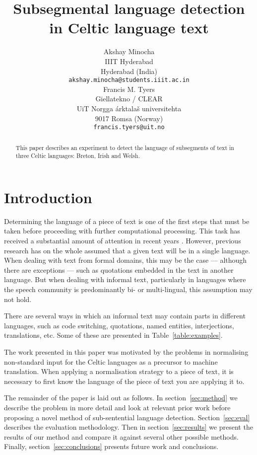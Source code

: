 \documentclass[11pt]{article}
\title{Subsegmental language detection in Celtic language text}
\author{Akshay Minocha \\
  IIIT Hyderabad  \\
  Hyderabad (India) \\
  {\small {\tt akshay.minocha@students.iiit.ac.in}} \\\And
  Francis M. Tyers \\
  Giellatekno / CLEAR \\
  UiT Norgga \'arktala\v{s} universitehta  \\
  9017 Romsa (Norway) \\
  {\small {\tt francis.tyers@uit.no}} \\}
\date{}
\begin{document}
\maketitle
\begin{abstract}
  This paper describes an experiment to detect the language of subsegments
  of text in three Celtic languages: Breton, Irish and Welsh. 
\end{abstract}

\section{Introduction}
\label{intro}

Determining the language of a piece of text is one of the first steps that must be taken
before proceeding with further computational processing. This task has received a substantial amount of
attention in recent years \cite{cavnar1994n,lui2012langid}. However, previous research has on the whole assumed
that a given text will be in a single language. When dealing with text from formal domains,
this may be the case --- although there are exceptions --- such as quotations embedded in
the text in another language. But when dealing with informal text, particularly in languages
where the speech community is predominantly bi- or multi-lingual, this assumption may not hold.

There are several ways in which an informal text may contain parts in different languages, such as
code switching, quotations, named entities, interjections, translations, etc. Some of these are presented
in Table~\ref{table:examples}.

The work presented in this paper was motivated by the problems in normalising non-standard input
for the Celtic languages as a precursor to machine translation. When applying a normalisation 
strategy to a piece of text, it is necessary to first know the language of the piece of text you 
are applying it to.

The remainder of the paper is laid out as follows. In section~\ref{sec:method} we describe the problem
in more detail and look at relevant prior work before proposing a novel method of sub-sentential
language detection. Section~\ref{sec:eval} describes the evaluation methodology. Then in section~\ref{sec:results}
we present the results of our method and compare it against several other possible methods. Finally, section~\ref{sec:conclusions}
presents future work and conclusions.
\end{document}

